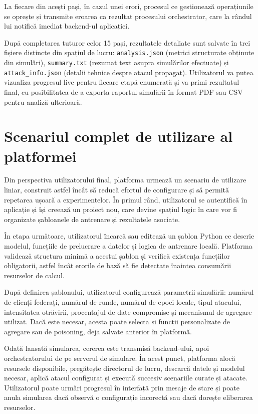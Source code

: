 \documentclass[../../main.tex]{subfiles}
\begin{document}
    La fiecare din acești pași, în cazul unei erori, procesul ce gestionează operațiuni\-le se oprește și transmite eroarea ca rezultat procesului orchestrator, care la rândul lui notifică imediat backend-ul aplicației.
    
    După completarea tuturor celor 15 pași, rezultatele detaliate sunt salvate în trei fișiere distincte din spațiul de lucru: \texttt{analysis.json} (metrici structurate obținute din simulări), \texttt{summary.txt} (rezumat text asupra simulărilor efectuate) și \texttt{attack\_info.json} (detalii tehnice despre atacul propagat). Utilizatorul va putea vizualiza progresul live pentru fiecare etapă enumerată și va primi rezultatul final, cu posibilitatea de a exporta raportul simulării în format PDF sau CSV pentru analiză ulterioară.
    
    \section{Scenariul complet de utilizare al platformei}

    Din perspectiva utilizatorului final, platforma urmează un scenariu de utilizare liniar, construit astfel încât să reducă efortul de configurare și să permită repetarea ușoară a experimentelor. În primul rând, utilizatorul se autentifică în aplicație și își creează un proiect nou, care devine spațiul logic în care vor fi organizate șabloanele de antrenare și rezultatele asociate.

    În etapa următoare, utilizatorul încarcă sau editează un șablon Python ce descrie modelul, funcțiile de prelucrare a datelor și logica de antrenare locală. Platforma validează structura minimă a acestui șablon și verifică existența funcțiilor obligatorii, astfel încât erorile de bază să fie detectate înaintea consumării resurselor de calcul.

    După definirea șablonului, utilizatorul configurează parametrii simulării: numărul de clienți federați, numărul de runde, numărul de epoci locale, tipul atacului, intensitatea otrăvirii, procentajul de date compromise și mecanismul de agregare utilizat. Dacă este necesar, acesta poate selecta și funcții personalizate de agregare sau de poisoning, deja salvate anterior în platformă.

    Odată lansată simularea, cererea este transmisă backend-ului, apoi orchestratorului de pe serverul de simulare. În acest punct, platforma alocă resursele disponibile, pregătește directorul de lucru, descarcă datele și modelul necesar, aplică atacul configurat și execută succesiv scenariile curate și atacate. Utilizatorul poate urmări progresul în interfață prin mesaje de stare și poate anula simularea dacă observă o configurație incorectă sau dacă dorește eliberarea resurselor.
\end{document}
